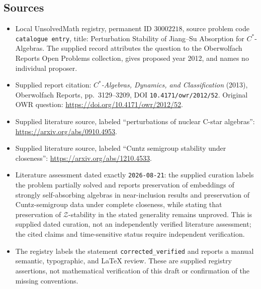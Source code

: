 \documentclass[11pt]{article}
\begin{document}
\subsection{Sources}
\begin{itemize}
\item Local UnsolvedMath registry, permanent ID \(30002218\), source problem code \texttt{catalogue entry}, title: Perturbation Stability of Jiang--Su Absorption for \(C^*\)-Algebras. The supplied record attributes the question to the Oberwolfach Reports Open Problems collection, gives proposed year 2012, and names no individual proposer.
\item Supplied report citation: \emph{\(C^*\)-Algebras, Dynamics, and Classification} (2013), Oberwolfach Reports, pp.\ 3129--3209, DOI \texttt{10.4171/owr/2012/52}. Original OWR question: \url{https://doi.org/10.4171/owr/2012/52}.
\item Supplied literature source, labeled ``perturbations of nuclear C-star algebras'': \url{https://arxiv.org/abs/0910.4953}.
\item Supplied literature source, labeled ``Cuntz semigroup stability under closeness'': \url{https://arxiv.org/abs/1210.4533}.
\item Literature assessment dated exactly \texttt{2026-08-21}: the supplied curation labels the problem partially solved and reports preservation of embeddings of strongly self-absorbing algebras in near-inclusion results and preservation of Cuntz-semigroup data under complete closeness, while stating that preservation of \(\mathcal Z\)-stability in the stated generality remains unproved. This is supplied dated curation, not an independently verified literature assessment; the cited claims and time-sensitive status require independent verification.
\item The registry labels the statement \texttt{corrected\_verified} and reports a manual semantic, typographic, and LaTeX review. These are supplied registry assertions, not mathematical verification of this draft or confirmation of the missing conventions.
\end{itemize}
\end{document}
